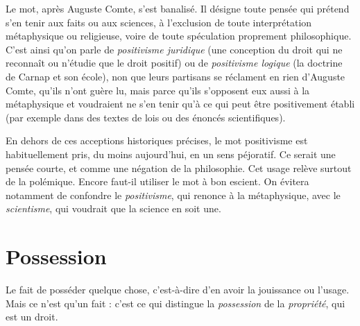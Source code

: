 \vspace{0.5cm}

Le mot, après Auguste Comte, s’est banalisé. Il désigne toute pensée qui
prétend s’en tenir aux faits ou aux sciences, à l’exclusion de toute interprétation
métaphysique ou religieuse, voire de toute spéculation proprement philosophique.
C’est ainsi qu’on parle de {\it positivisme juridique} (une conception du
droit qui ne reconnaît ou n’étudie que le droit positif) ou de {\it positivisme logique}
(la doctrine de Carnap et son école), non que leurs partisans se réclament en
rien d’Auguste Comte, qu’ils n’ont guère lu, mais parce qu’ils s’opposent eux
aussi à la métaphysique et voudraient ne s’en tenir qu’à ce qui peut être positivement
établi (par exemple dans des textes de lois ou des énoncés scientifiques).

En dehors de ces acceptions historiques précises, le mot positivisme est
habituellement pris, du moins aujourd’hui, en un sens péjoratif. Ce serait une
pensée courte, et comme une négation de la philosophie. Cet usage relève surtout
de la polémique. Encore faut-il utiliser le mot à bon escient. On évitera
notamment de confondre le {\it positivisme}, qui renonce à la métaphysique, avec le
{\it scientisme}, qui voudrait que la science en soit une.

\section{Possession}
Le fait de posséder quelque chose, c’est-à-dire d’en avoir la
jouissance ou l’usage. Mais ce n’est qu’un fait : c’est ce qui
distingue la {\it possession} de la {\it propriété}, qui est un droit.

